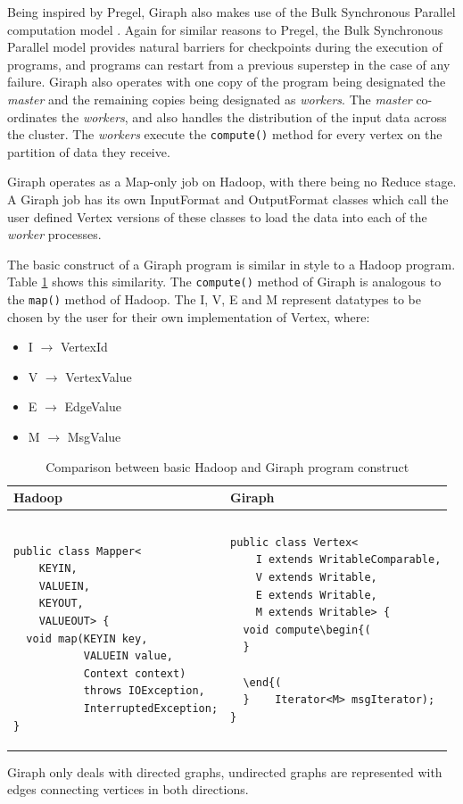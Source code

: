 Being inspired by Pregel, Giraph also makes use of the Bulk Synchronous Parallel computation model \cite{bsp}. Again for similar reasons to Pregel, the Bulk Synchronous Parallel model provides natural barriers for checkpoints during the execution of programs, and programs can restart from a previous superstep in the case of any failure. Giraph also operates with one copy of the program being designated the \emph{master} and the remaining copies being designated as \emph{workers}. The \emph{master} co-ordinates the \emph{workers}, and also handles the distribution of the input data across the cluster. The \emph{workers} execute the \verb/compute()/ method for every vertex on the partition of data they receive.

Giraph operates as a Map-only job on Hadoop, with there being no Reduce stage. A Giraph job has its own InputFormat and OutputFormat classes which call the user defined Vertex versions of these classes to load the data into each of the \emph{worker} processes.

The basic construct of a Giraph program is similar in style to a Hadoop program. Table \ref{tab:hadoopgiraph} shows this similarity. The \verb/compute()/ method of Giraph is analogous to the \verb/map()/ method of Hadoop. The I, V, E and M represent datatypes to be chosen by the user for their own implementation of Vertex, where:

\begin{itemize}
	\item I $\rightarrow$ VertexId
	\item V $\rightarrow$ VertexValue
	\item E $\rightarrow$ EdgeValue
	\item M $\rightarrow$ MsgValue
\end{itemize}

\begin{table}%
\centering
\begin{tabular}{|m{7.25cm}|m{7.25cm}|} \hline
Hadoop & Giraph \\ \hline
\begin{verbatim}

public class Mapper<
    KEYIN,
    VALUEIN,
    KEYOUT,
    VALUEOUT> {
  void map(KEYIN key,
           VALUEIN value,
           Context context)
           throws IOException,
           InterruptedException;
}
\end{verbatim} &
\begin{verbatim}
public class Vertex<
    I extends WritableComparable,
    V extends Writable,
    E extends Writable,
    M extends Writable> {
  void compute\begin{(
  }
  	
  \end{(
  }    Iterator<M> msgIterator);
}
\end{verbatim} \\
\hline
\end{tabular}
\caption{Comparison between basic Hadoop and Giraph program construct \cite{giraphtalk}}
\label{tab:hadoopgiraph}
\end{table}

Giraph only deals with directed graphs, undirected graphs are represented with edges connecting vertices in both directions.